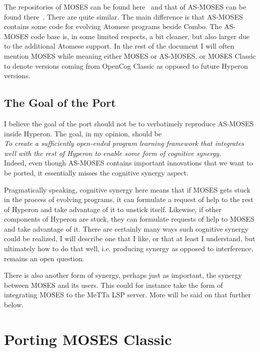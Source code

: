 \documentclass[]{report}
\begin{document}
The repositories of MOSES can be found here~\cite{MOSES} and that of
AS-MOSES can be found there~\cite{ASMOSES}.  There are quite similar.
The main difference is that AS-MOSES contains some code for evolving
Atomese programs beside Combo.  The AS-MOSES code base is, in some
limited respects, a bit cleaner, but also larger due to the additional
Atomese support.  In the rest of the document I will often mention
MOSES while meaning either MOSES or AS-MOSES, or MOSES Classic to
denote versions coming from OpenCog Classic as opposed to future
Hyperon versions.

\section{The Goal of the Port}

I believe the goal of the port should not be to verbatimely reproduce
AS-MOSES inside Hyperon.  The goal, in my opinion, should be\\

\emph{To create a sufficiently open-ended program learning framework
that integrates well with the rest of Hyperon to enable some form of
cognitive synergy}.\\

Indeed, even though AS-MOSES contains important innovations that we
want to be ported, it essentially misses the cognitive synergy aspect.

Pragmatically speaking, cognitive synergy here means that if MOSES
gets stuck in the process of evolving programs, it can formulate a
request of help to the rest of Hyperon and take advantage of it to
unstick itself.  Likewise, if other components of Hyperon are stuck,
they can formulate requests of help to MOSES and take advantage of it.
There are certainly many ways such cognitive synergy could be
realized, I will describe one that I like, or that at least I
understand, but ultimately how to do that well, i.e. producing synergy
as opposed to interference, remains an open question.

There is also another form of synergy, perhaps just as important, the
synergy between MOSES and its users.  This could for instance take the
form of integrating MOSES to the MeTTa LSP server.  More will be said
on that further below.

\chapter{Porting MOSES Classic}
\end{document}
